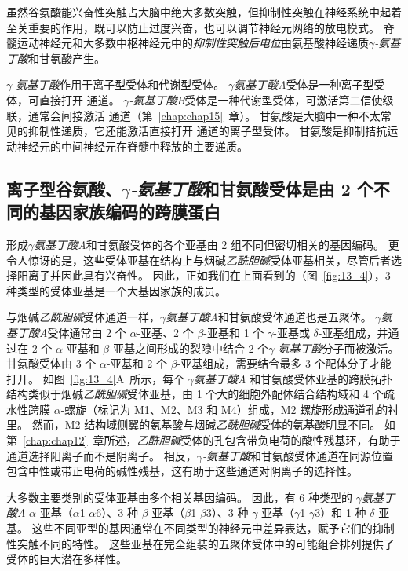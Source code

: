 虽然谷氨酸能兴奋性突触占大脑中绝大多数突触，但抑制性突触在神经系统中起着至关重要的作用，既可以防止过度兴奋，也可以调节神经元网络的放电模式。
脊髓运动神经元和大多数中枢神经元中的\textit{抑制性突触后电位}由氨基酸神经递质\textit{$\gamma$-氨基丁酸}和甘氨酸产生。


\textit{$\gamma$-氨基丁酸}作用于离子型受体和代谢型受体。
\textit{$\gamma$氨基丁酸A}受体是一种离子型受体，可直接打开  通道。
\textit{$\gamma$-氨基丁酸B}受体是一种代谢型受体，可激活第二信使级联，通常会间接激活  通道（第~\ref{chap:chap15}~章）。 
甘氨酸是大脑中一种不太常见的抑制性递质，它还能激活直接打开  通道的离子型受体。
甘氨酸是抑制拮抗运动神经元的中间神经元在脊髓中释放的主要递质。



\subsection{离子型谷氨酸、\textit{$\gamma$-氨基丁酸}和甘氨酸受体是由 2 个不同的基因家族编码的跨膜蛋白}

形成\textit{$\gamma$氨基丁酸A}和甘氨酸受体的各个亚基由 2 组不同但密切相关的基因编码。
更令人惊讶的是，这些受体亚基在结构上与烟碱\textit{乙酰胆碱}受体亚基相关，尽管后者选择阳离子并因此具有兴奋性。 
因此，正如我们在上面看到的（图~\ref{fig:13_4}），3 种类型的受体亚基是一个大基因家族的成员。


与烟碱\textit{乙酰胆碱}受体通道一样，\textit{$\gamma$氨基丁酸A}和甘氨酸受体通道也是五聚体。
\textit{$\gamma$氨基丁酸A}受体通常由 2 个 $\alpha$-亚基、2 个 $\beta$-亚基和 1 个 $\gamma$-亚基或 $\delta$-亚基组成，并通过在 2 个 $\alpha$-亚基和 $\beta$-亚基之间形成的裂隙中结合 2 个\textit{$\gamma$-氨基丁酸}分子而被激活。
甘氨酸受体由 3 个 $\alpha$-亚基和 2 个 $\beta$-亚基组成，需要结合最多 3 个配体分子才能打开。
如图~\ref{fig:13_4}A~所示，每个 \textit{$\gamma$氨基丁酸A} 和甘氨酸受体亚基的跨膜拓扑结构类似于烟碱\textit{乙酰胆碱}受体亚基，由 1 个大的细胞外配体结合结构域和 4 个疏水性跨膜 $\alpha$-螺旋（标记为 M1、M2、M3 和 M4）组成，M2 螺旋形成通道孔的衬里。
然而，M2 结构域侧翼的氨基酸与烟碱\textit{乙酰胆碱}受体的氨基酸明显不同。
如第~\ref{chap:chap12}~章所述，\textit{乙酰胆碱}受体的孔包含带负电荷的酸性残基环，有助于通道选择阳离子而不是阴离子。
相反，\textit{$\gamma$-氨基丁酸}和甘氨酸受体通道在同源位置包含中性或带正电荷的碱性残基，这有助于这些通道对阴离子的选择性。


大多数主要类别的受体亚基由多个相关基因编码。
因此，有 6 种类型的 \textit{$\gamma$氨基丁酸A} $\alpha$-亚基（$\alpha$1-$\alpha$6）、3 种 $\beta$-亚基（$\beta$1-$\beta$3）、3 种 $\gamma$-亚基（$\gamma$1-$\gamma$3）和 1 种 $\delta$-亚基。
这些不同亚型的基因通常在不同类型的神经元中差异表达，赋予它们的抑制性突触不同的特性。
这些亚基在完全组装的五聚体受体中的可能组合排列提供了受体的巨大潜在多样性。


